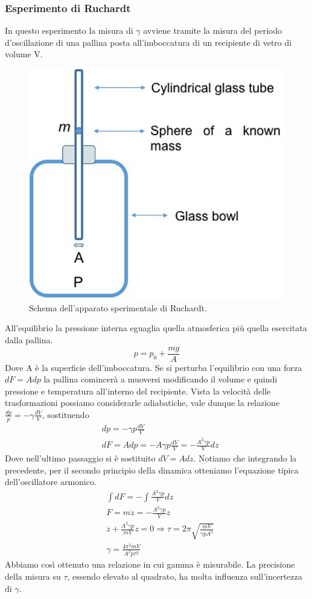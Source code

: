 \documentclass[
10pt, %
a4paper, %
oneside, %
headinclude,footinclude, %
BCOR5mm, %
]{scrartcl}
\begin{document}
\subsubsection*{Esperimento di Ruchardt}
In questo esperimento la misura di \(\gamma\) avviene tramite la misura del periodo d'oscillazione di una pallina posta all'imboccatura di un recipiente di vetro di volume V.
\begin{figure}[h!]
	\centering
	\includegraphics[width=0.4\linewidth]{../images/ruchardt}
	\caption{Schema dell'apparato sperimentale di Ruchardt.}
	\label{fig:ruchardt}
\end{figure}
\FloatBarrier
All'equilibrio la pressione interna eguaglia quella atmosferica più quella esercitata dalla pallina. \[p = p_0 + \frac{m g}{A}\] Dove A è la superficie dell'imboccatura. Se si perturba l'equilibrio con una forza \(dF = A dp\) la pallina comincerà a muoversi modificando il volume e quindi pressione e temperatura all'interno del recipiente. Vista la velocità delle trasformazioni possiamo considerarle adiabatiche, vale dunque la relazione \(\frac{dp}{p}=-\gamma\frac{dV}{V}\), sostituendo
\begin{align*}
	&dp = -\gamma p \frac{dV}{V}\\
	&dF = A dp = - A \gamma p \frac{dV}{V} = - \frac{A^2 \gamma p}{V}dz
\end{align*} 
Dove nell'ultimo passaggio si è sostituito $dV = A dz$. Notiamo che integrando la precedente, per il secondo principio della dinamica otteniamo l'equazione tipica dell'oscillatore armonico. 
\begin{align*}
	&\int dF = -\int  \frac{A^2 \gamma p}{V}dz\\
	&F = m \ddot{z}= - \frac{A^2 \gamma p}{V} z\\
	&\ddot{z} + \frac{A^2 \gamma p}{m V} z = 0 \Rightarrow \tau = 2\pi \sqrt{\frac{mV}{\gamma p A^2}}\\
	&\gamma = \frac{4 \pi^2 m V}{A^2 p \tau^2}
\end{align*}
Abbiamo così ottenuto una relazione in cui gamma è misurabile. La precisione della misura su $\tau$, essendo elevato al quadrato, ha molta influenza sull'incertezza di $\gamma$. 
\end{document}
